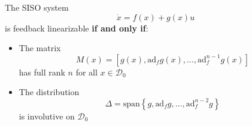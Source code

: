 The SISO system
\begin{equation*}
    \dot{x} = f(x) + g(x)u
\end{equation*}
is feedback linearizable \textbf{if and only if}:
\begin{itemize}
    \item The matrix
          \begin{equation*}
              M(x) = \left[g(x), \text{ad}_f g(x), \ldots, \text{ad}_f^{n-1} g(x)\right]
          \end{equation*}
          has full rank $n$ for all $x \in \mathcal{D}_0$
    \item The distribution
          \begin{equation*}
              \Delta = \text{span}\left\{g, \text{ad}_f g, \ldots, \text{ad}_f^{n-2} g\right\}
          \end{equation*}
          is involutive on $\mathcal{D}_0$
\end{itemize}